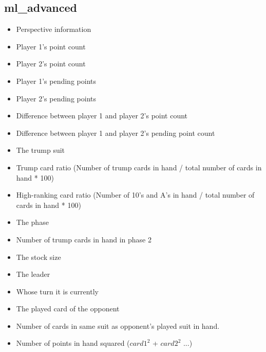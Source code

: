 \documentclass[a4paper,11pt]{article}
\begin{document}
\subsection{ml\_advanced}
\begin{itemize}
\item Perspective information
\item Player 1's point count
\item Player 2's point count
\item Player 1's pending points
\item Player 2's pending points
\item Difference between player 1 and player 2's point count
\item Difference between player 1 and player 2's pending point count
\item The trump suit
\item Trump card ratio (Number of trump cards in hand / total number of cards in hand * 100)
\item High-ranking card ratio (Number of 10's and A's in hand / total number of cards in hand * 100)
\item The phase
\item Number of trump cards in hand in phase 2
\item The stock size
\item The leader
\item Whose turn it is currently
\item The played card of the opponent
\item Number of cards in same suit as opponent's played suit in hand.
\item Number of points in hand squared ($card1^2$ + $card2^2$ ...)
\end{itemize}
\end{document}
